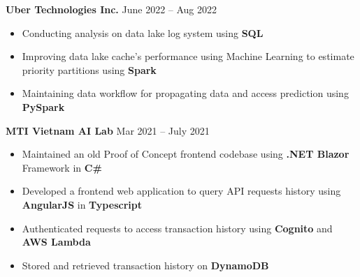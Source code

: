 \documentclass[11pt]{article}
\begin{document}
\hspace{10pt}\textbf{Uber Technologies Inc.} \hfill {\small June 2022 -- Aug 2022} \\
  \vspace{-2pt}
  \begin{itemize}[leftmargin=31pt]
    \vspace{-10pt}
    \setlength\itemsep{-5pt}
    \item {\small Conducting analysis on data lake log system using \textbf{SQL}}
    \item {\small Improving data lake cache's performance using Machine Learning to estimate priority partitions using \textbf{Spark}}
    \item {\small Maintaining data workflow for propagating data and access prediction using \textbf{PySpark}}
    \vspace{-7pt}
  \end{itemize}

\hspace{10pt}\textbf{MTI Vietnam AI Lab} \hfill {\small Mar 2021 -- July 2021} \\
  \vspace{-2pt}
  \begin{itemize}[leftmargin=31pt]
  \vspace{-10pt}
    \setlength\itemsep{-5pt}
      \item {\small Maintained an old Proof of Concept frontend codebase using \textbf{.NET Blazor} Framework in \textbf{C\#}}
      \item {\small Developed a frontend web application to query API requests history using \textbf{AngularJS} in \textbf{Typescript}}
      \item {\small Authenticated requests to access transaction history using \textbf{Cognito} and \textbf{AWS Lambda}}
      \item {\small Stored and retrieved transaction history on \textbf{DynamoDB}}
    \vspace{-7pt}
  \end{itemize}
\end{document}
